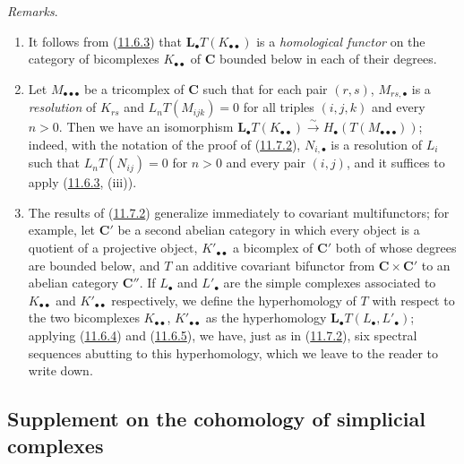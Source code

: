 \begin{env}[11.7.3]
\label{0.11.7.3}
\emph{Remarks}.
\begin{enumerate}
\item[{\rm(i)}] It follows from (\hyperref[0.11.6.3]{11.6.3}) that
$\mathbf{L}_\bullet T(K_{\bullet\bullet})$ is a \emph{homological functor} on the
category of bicomplexes $K_{\bullet\bullet}$ of $\boldsymbol{C}$ bounded below
in each of their degrees.
\item[{\rm(ii)}] Let $M_{\bullet\bullet\bullet}$ be a tricomplex of
$\boldsymbol{C}$ such that for each pair $(r,s)$,
$M_{rs,\bullet}$ is a \emph{resolution} of $K_{rs}$ and
$L_nT(M_{ijk})=0$ for all triples $(i,j,k)$ and every $n>0$. Then we have
an isomorphism $\mathbf{L}_\bullet T(K_{\bullet\bullet})
\xrightarrow{\sim} H_\bullet(T(M_{\bullet\bullet\bullet}))$;
indeed, with the notation of the proof of
(\hyperref[0.11.7.2]{11.7.2}), $N_{i,\bullet}$ is a resolution of
$L_i$ such that $L_nT(N_{ij})=0$ for $n>0$ and every pair $(i,j)$, and it
suffices to apply (\hyperref[0.11.6.3]{11.6.3}, (iii)).
\item[{\rm(iii)}] The results of (\hyperref[0.11.7.2]{11.7.2}) generalize
immediately to covariant multifunctors; for example,
let $\boldsymbol{C}'$ be a second abelian category in which every object
is a quotient of a projective object, $K'_{\bullet\bullet}$ a bicomplex of
$\boldsymbol{C}'$ both of whose degrees are bounded below, and $T$ an
additive covariant bifunctor from $\boldsymbol{C}\times\boldsymbol{C}'$ to an
abelian category $\boldsymbol{C}''$. If $L_\bullet$ and $L'_\bullet$ are the
simple complexes associated to $K_{\bullet\bullet}$ and
$K'_{\bullet\bullet}$ respectively, we define the hyperhomology of $T$ with
respect to the two bicomplexes $K_{\bullet\bullet}$,
$K'_{\bullet\bullet}$ as the hyperhomology
$\mathbf{L}_\bullet T(L_\bullet,L'_\bullet)$; applying
(\hyperref[0.11.6.4]{11.6.4}) and
(\hyperref[0.11.6.5]{11.6.5}), we have, just as in
(\hyperref[0.11.7.2]{11.7.2}), six spectral sequences abutting to this
hyperhomology, which we leave to the reader to write down.
\end{enumerate}
\end{env}

\subsection{Supplement on the cohomology of simplicial complexes}
\label{subsection:0.11.8}

